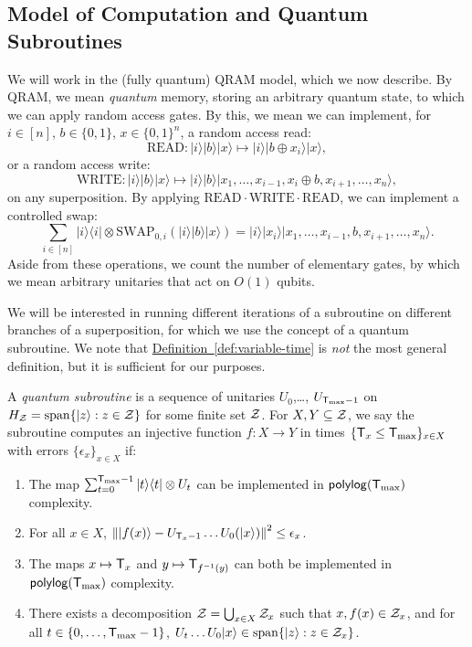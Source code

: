 \documentclass{article}
\newcommand{\defin}[1]{\hyperref[def:#1]{Definition~\ref*{def:#1}}}
\def\ket#1{{\lvert}#1\rangle}
\def\bra#1{{\langle}#1\rvert}
\renewcommand{\>}{\rangle}
\newcommand{\<}{\langle}
\renewcommand{\(}{\left(}
\renewcommand{\)}{\right)}
\def\norm#1{\left\| #1 \right\|}
\begin{document}
\subsection{Model of Computation and Quantum Subroutines}\label{sec:model}

We will work in the (fully quantum) QRAM model, which we now describe. By QRAM, we mean \emph{quantum} memory, storing an arbitrary quantum state, to which we can apply random access gates. By this, we mean we can implement, for $i\in [n]$, $b\in\{0,1\}$, $x\in \{0,1\}^n$, a random access read:
$$\text{READ}:\ket{i}\ket{b}\ket{x} \mapsto \ket{i}\ket{b\oplus x_i}\ket{x},$$
or a random access write:
$$\text{WRITE}:\ket{i}\ket{b}\ket{x} \mapsto \ket{i}\ket{b}\ket{x_1,\dots,x_{i-1},x_i\oplus b,x_{i+1},\dots,x_n},$$
on any superposition.
By applying $\text{READ}\cdot\text{WRITE}\cdot\text{READ}$, we can implement a controlled swap:
$$\sum_{i\in [n]}\ket{i}\bra{i}\otimes \text{SWAP}_{0,i}(\ket{i}\ket{b}\ket{x}) = \ket{i}\ket{x_i}\ket{x_1,\dots,x_{i-1},b,x_{i+1},\dots,x_n}.$$
Aside from these operations, we count the number of elementary gates, by which we mean arbitrary unitaries that act on $O(1)$ qubits. 


We will be interested in running different iterations of a subroutine on different branches of a superposition, for which we use the concept of a quantum subroutine. We note that \defin{variable-time} is \emph{not} the most general definition, but it is sufficient for our purposes. 

\begin{definition}\label{def:variable-time}
A \emph{quantum subroutine} is a sequence of unitaries $U_0$,\dots, $U_{{\sf T}_{\max}-1}$ on 
$H_{\cal Z}=\mathrm{span}\{\ket{z}:z\in{\cal Z}\}$
for some finite set ${\cal Z}$. For $X,Y\subseteq{\cal Z}$, we say the subroutine computes an injective function $f:X\rightarrow Y$ in times $\{{\sf T}_x\leq {\sf T}_{\max}\}_{x\in X}$ with errors $\{\epsilon_x\}_{x\in X}$ if:
\begin{enumerate}
\item The map $\sum_{t=0}^{{\sf T}_{\max}-1}\ket{t}\bra{t}\otimes U_t$ can be implemented in ${\sf polylog}({\sf T}_{\max})$ complexity.\label{item:select}
\item For all $x\in X$, $\norm{\ket{f(x)} - U_{{\sf T}_x-1}\dots U_0(\ket{x})}^2\leq \epsilon_x$. \label{item:error}
\item The maps $x\mapsto {\sf T}_x$ and $y\mapsto {\sf T}_{f^{-1}(y)}$ can both be implemented in ${\sf polylog}({\sf T}_{\max})$ complexity.\label{item:known-times}
\item There exists a decomposition ${\cal Z}=\bigcup_{x\in X} {\cal Z}_x$ such that $x,f(x)\in {\cal Z}_x$, and for all $t\in \{0,\dots,{\sf T}_{\max}-1\}$, $U_t\dots U_0\ket{x}\in \mathrm{span}\{\ket{z}:z\in {\cal Z}_x\}$. \label{item:non-confusion}

\end{enumerate}
\end{definition}
\end{document}
